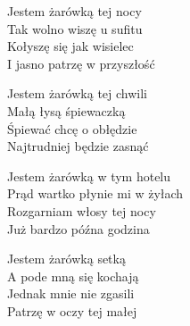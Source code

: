 \begin{text}
    Jestem żarówką tej nocy\\
    Tak wolno wiszę u sufitu\\
    Kołyszę się jak wisielec\\
    I jasno patrzę w przyszłość

    Jestem żarówką tej chwili\\
    Małą łysą śpiewaczką\\
    Śpiewać chcę o obłędzie\\
    Najtrudniej będzie zasnąć

    Jestem żarówką w tym hotelu\\
    Prąd wartko płynie mi w żyłach\\
    Rozgarniam włosy tej nocy\\
    Już bardzo późna godzina

    Jestem żarówką setką\\
    A pode mną się kochają\\
    Jednak mnie nie zgasili\\
    Patrzę w oczy tej małej
\end{text}
\begin{chord}

\end{chord}